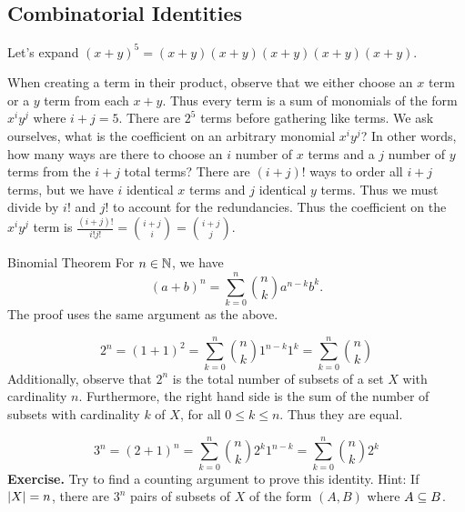 \documentclass[class=article, crop=false]{standalone}
\begin{document}
  \subsection{Combinatorial Identities}
  \begin{example}{}
    Let's expand $(x+y)^5 = (x+y)(x+y)(x+y)(x+y)(x+y)$. \par
    When creating a term in their product, observe that we either choose an $x$ term or a $y$ term from each $x+y$. Thus every term is a sum of monomials of the form $x^iy^j$ where $i+j=5$. There are $2^5$ terms before gathering like terms. We ask ourselves, what is the coefficient on an arbitrary monomial $x^iy^j$? In other words, how many ways are there to choose an $i$ number of $x$ terms and a $j$ number of $y$ terms from the $i+j$ total terms? There are $(i+j)!$ ways to order all $i+j$ terms, but we have $i$ identical $x$ terms and $j$ identical $y$ terms. Thus we must divide by $i!$ and $j!$ to account for the redundancies. Thus the coefficient on the $x^iy^j$ term is $\frac{(i+j)!}{i!j!}=\binom{i+j}{i}=\binom{i+j}{j}$. 
  \end{example}
  \begin{theorem}{Binomial Theorem}
    For $n\in\mathbb{N}$, we have
    \[
      (a+b)^n = \sum_{k=0}^n \binom{n}{k} a^{n-k}b^k.
    \]
    The proof uses the same argument as the above.
  \end{theorem}
  \begin{example}{}
    \[
      2^n = (1+1)^2 = \sum_{k=0}^n \binom{n}{k}1^{n-k}1^k = \sum_{k=0}^n \binom{n}{k}
    \]
    Additionally, observe that $2^n$ is the total number of subsets of a set $X$ with cardinality $n$. Furthermore, the right hand side is the sum of the number of subsets with cardinality $k$ of $X$, for all $0\leq k\leq n$. Thus they are equal.
  \end{example}
  \begin{example}{}
    \[
      3^n = (2+1)^n = \sum_{k=0}^n\binom{n}{k} 2^k 1^{n-k}  = \sum_{k=0}^n \binom{n}{k}2^k 
    \]
    \textbf{Exercise.} Try to find a counting argument to prove this identity. Hint: If $\left\lvert X \right\rvert=n$, there are $3^n$ pairs of subsets of $X$ of the form $(A, B)$ where $A\subseteq B$.
  \end{example}
\end{document}
